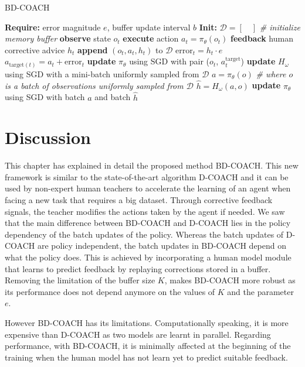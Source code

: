 \begin{algorithm}[H]
\caption{BD-COACH}\label{algorithm:BD-COACH}
\begin{algorithmic}[1]
\State \textbf{Require:} error magnitude $e$, buffer update interval $b$
\State \textbf{Init:} $\mathcal{D} = [\quad]$  \emph{\# initialize memory buffer}
\State \textbf{observe} state $o_{t}$
\State \textbf{execute} action $a_{t}=\pi_{\theta}(o_{t})$
\State \textbf{feedback} human corrective advice $h_{t}$
\State \textbf{append} $(o_{t}, a_{t}, h_{t})$ to $\mathcal{D}$
\State $\text{error}_{t} = h_{t}\cdot e$
\State $a_{\text{target}(t)} = a_{t} + \text{error}_{t}$
\State \textbf{update} $\pi_\theta$ using SGD with pair ($o_{t}$, $a^{\text{target}}_{t}$)
\EndIf
{}
\State \textbf{update} $H_\omega$ using SGD with a mini-batch uniformly sampled from $\mathcal{D}$
\State  $a=\pi_{\theta}(o)$ \emph{\# where $o$ is a batch of observations uniformly sampled from $\mathcal{D}$}
\State  $\hat{h}=H_\omega(a, o)$
\State \textbf{update} $\pi_{\theta}$ using SGD with batch $a$ and batch $\hat{h}$
\EndIf
\EndFor
\end{algorithmic}
\label{al:D-COACH with HM}
\end{algorithm}










\section{Discussion}
\label{section:Algorithm-Discussion}
This chapter has explained in detail the proposed method BD-COACH. This new framework is similar to the state-of-the-art algorithm D-COACH and it can be used by non-expert human teachers to accelerate the learning of an agent when facing a new task that requires a big dataset. Through corrective feedback signals, the teacher modifies the actions taken by the agent if needed. We saw that the main difference between BD-COACH and D-COACH lies in the policy dependency of the batch updates of the policy. Whereas the batch updates of D-COACH are policy independent, the batch updates in BD-COACH depend on what the policy does. This is achieved by incorporating a human model module that learns to predict feedback by replaying corrections stored in a buffer. Removing the limitation of the buffer size $K$, makes BD-COACH more robust as its performance does not depend anymore on the values of $K$ and the parameter $e$.

However BD-COACH has its limitations. Computationally speaking, it is more expensive than D-COACH as two models are learnt in parallel. Regarding performance, with BD-COACH, it is minimally affected at the beginning of the training when the human model has not learn yet to predict suitable feedback.


